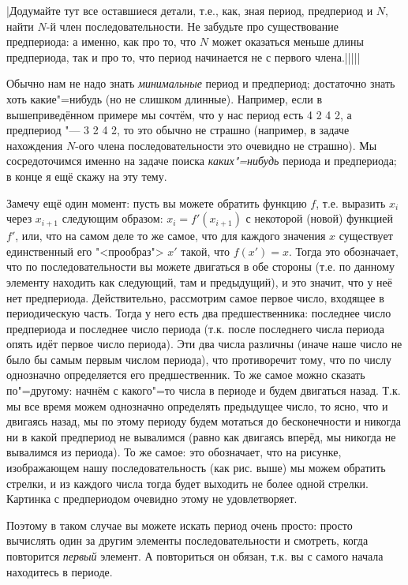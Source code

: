 \task|Додумайте тут все оставшиеся детали, т.е., как, зная период, предпериод и 
$N$, найти $N$-й член последовательности. Не забудьте про существование предпериода: а именно, как 
про то, что $N$ может оказаться меньше длины предпериода, так и про то, что период начинается 
не с первого члена.|||||

Обычно нам не надо знать \textit{минимальные} период и предпериод; достаточно знать хоть 
какие"=нибудь (но не слишком длинные). Например, если в вышеприведённом примере мы сочтём, что 
у нас период есть 4 2 4 2, а предпериод "--- 3 2 4 2, то это обычно не страшно (например, в 
задаче нахождения $N$-ого члена последовательности это очевидно не страшно). Мы сосредоточимся 
именно на задаче поиска \textit{каких"=нибудь} периода и предпериода; в конце я ещё скажу на эту тему.

Замечу ещё один момент: пусть вы можете обратить функцию $f$, т.е. выразить $x_i$ через 
$x_{i+1}$ следующим образом: $x_i=f'(x_{i+1})$ с некоторой (новой) функцией $f'$, или, что на самом 
деле то же самое, что для каждого значения $x$ 
существует единственный его "<прообраз"> $x'$ такой, что $f(x')=x$. Тогда это обозначает, что 
по последовательности вы можете двигаться в обе стороны (т.е. по данному элементу находить как 
следующий, там и предыдущий), и это значит, что у неё нет предпериода. Действительно, рассмотрим 
самое первое число, входящее в периодическую часть. Тогда у него есть два 
предшественника: последнее число предпериода и последнее число периода (т.к. после последнего 
числа периода опять идёт первое число периода). Эти два числа различны (иначе наше число не 
было бы самым первым числом периода), что противоречит тому, что по числу однозначно 
определяется его предшественник. То же самое можно сказать по"=другому: начнём с какого"=то 
числа в периоде и будем двигаться назад. Т.к. мы все время можем однозначно определять 
предыдущее число, то ясно, что и двигаясь назад, мы по этому периоду будем мотаться до 
бесконечности и никогда ни в какой предпериод не вывалимся (равно как двигаясь вперёд, мы 
никогда не вывалимся из периода). То же самое: это обозначает, что на рисунке, изображающем 
нашу последовательность (как рис. выше) мы можем обратить стрелки, и из каждого числа тогда 
будет выходить не более одной стрелки. Картинка с предпериодом очевидно этому не 
удовлетворяет.

Поэтому в таком случае вы можете искать период очень просто: просто вычислять один за другим 
элементы последовательности и смотреть, когда повторится \textit{первый} элемент. А повториться он 
обязан, т.к. вы с самого начала находитесь в периоде.

